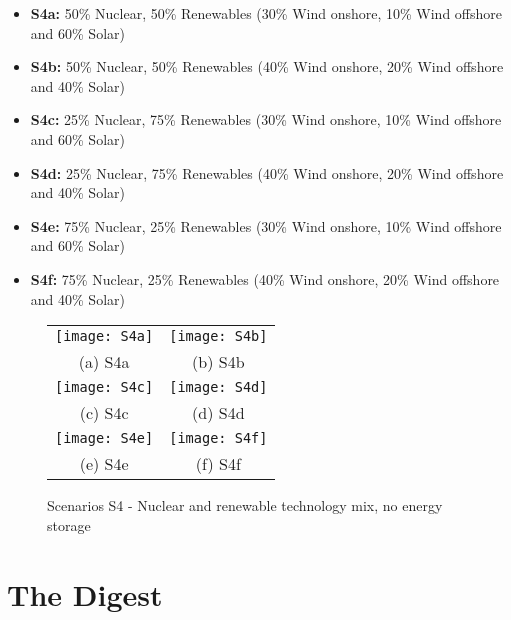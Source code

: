 \begin{kaobox}[frametitle=S4 scenarios]
\begin{itemize}
	\item \textbf{S4a:} 50\% Nuclear, 50\% Renewables (30\% Wind onshore, 10\% Wind offshore and 60\% Solar)
	\item \textbf{S4b:} 50\% Nuclear, 50\% Renewables (40\% Wind onshore, 20\% Wind offshore and 40\% Solar)
	\item \textbf{S4c:} 25\% Nuclear, 75\% Renewables (30\% Wind onshore, 10\% Wind offshore and 60\% Solar)
	\item \textbf{S4d:} 25\% Nuclear, 75\% Renewables (40\% Wind onshore, 20\% Wind offshore and 40\% Solar)
	\item \textbf{S4e:} 75\% Nuclear, 25\% Renewables (30\% Wind onshore, 10\% Wind offshore and 60\% Solar)
	\item \textbf{S4f:} 75\% Nuclear, 25\% Renewables (40\% Wind onshore, 20\% Wind offshore and 40\% Solar)
\end{itemize}
\end{kaobox}



\begin{figure*}
\begin{tabular}{cc}
  \texttt{[image: S4a]} &   \texttt{[image: S4b]} \\
(a) S4a & (b) S4b \\[6pt]
 \texttt{[image: S4c]} &   \texttt{[image: S4d]} \\
(c) S4c & (d) S4d \\[6pt]
 \texttt{[image: S4e]} &   \texttt{[image: S4f]} \\
(e) S4e & (f) S4f \\[6pt]
\end{tabular}
\caption{Scenarios S4 - Nuclear and renewable technology mix, no energy storage}
\end{figure*}




\section{The Digest}


